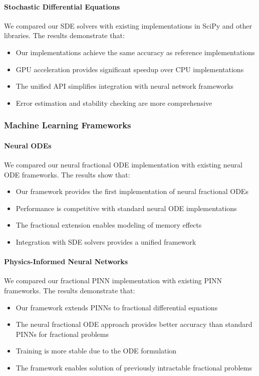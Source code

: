 \paragraph{Stochastic Differential Equations}
We compared our SDE solvers with existing implementations in SciPy and other libraries. The results demonstrate that:

\begin{itemize}
    \item Our implementations achieve the same accuracy as reference implementations
    \item GPU acceleration provides significant speedup over CPU implementations
    \item The unified API simplifies integration with neural network frameworks
    \item Error estimation and stability checking are more comprehensive
\end{itemize}

\subsubsection{Machine Learning Frameworks}

\paragraph{Neural ODEs}
We compared our neural fractional ODE implementation with existing neural ODE frameworks. The results show that:

\begin{itemize}
    \item Our framework provides the first implementation of neural fractional ODEs
    \item Performance is competitive with standard neural ODE implementations
    \item The fractional extension enables modeling of memory effects
    \item Integration with SDE solvers provides a unified framework
\end{itemize}

\paragraph{Physics-Informed Neural Networks}
We compared our fractional PINN implementation with existing PINN frameworks. The results demonstrate that:

\begin{itemize}
    \item Our framework extends PINNs to fractional differential equations
    \item The neural fractional ODE approach provides better accuracy than standard PINNs for fractional problems
    \item Training is more stable due to the ODE formulation
    \item The framework enables solution of previously intractable fractional problems
\end{itemize}

